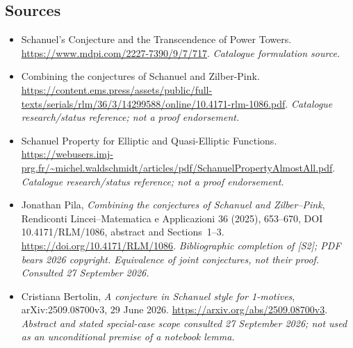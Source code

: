 \documentclass[11pt,a4paper]{article}
\numberwithin{equation}{section}
\begin{document}
\subsection{Sources}
\begin{itemize}\raggedright
\item[\textnormal{[S1]}]\hypertarget{source:3367:1}{} Schanuel's Conjecture and the Transcendence of Power Towers.
\url{https://www.mdpi.com/2227-7390/9/7/717}.
{\small\textit{Catalogue formulation source.}}
\item[\textnormal{[S2]}]\hypertarget{source:3367:2}{} Combining the conjectures of Schanuel and Zilber-Pink.
\url{https://content.ems.press/assets/public/full-texts/serials/rlm/36/3/14299588/online/10.4171-rlm-1086.pdf}.
{\small\textit{Catalogue research/status reference; not a proof endorsement.}}
\item[\textnormal{[S3]}]\hypertarget{source:3367:3}{} Schanuel Property for Elliptic and Quasi-Elliptic Functions.
\url{https://webusers.imj-prg.fr/~michel.waldschmidt/articles/pdf/SchanuelPropertyAlmostAll.pdf}.
{\small\textit{Catalogue research/status reference; not a proof endorsement.}}
\item[\textnormal{[E1]}]\hypertarget{extra:3367:1}{} Jonathan Pila,
\emph{Combining the conjectures of Schanuel and Zilber--Pink},
Rendiconti Lincei--Matematica e Applicazioni 36 (2025), 653--670,
DOI 10.4171/RLM/1086, abstract and Sections~1--3.
\url{https://doi.org/10.4171/RLM/1086}.
{\small\textit{Bibliographic completion of [S2]; PDF bears 2026 copyright.
Equivalence of joint conjectures, not their proof. Consulted 27 September 2026.}}
\item[\textnormal{[E2]}]\hypertarget{extra:3367:2}{} Cristiana Bertolin,
\emph{A conjecture in Schanuel style for 1-motives},
arXiv:2509.08700v3, 29 June 2026.
\url{https://arxiv.org/abs/2509.08700v3}.
{\small\textit{Abstract and stated special-case scope consulted
27 September 2026; not used as an unconditional premise of a notebook lemma.}}

\end{itemize}

\end{document}
